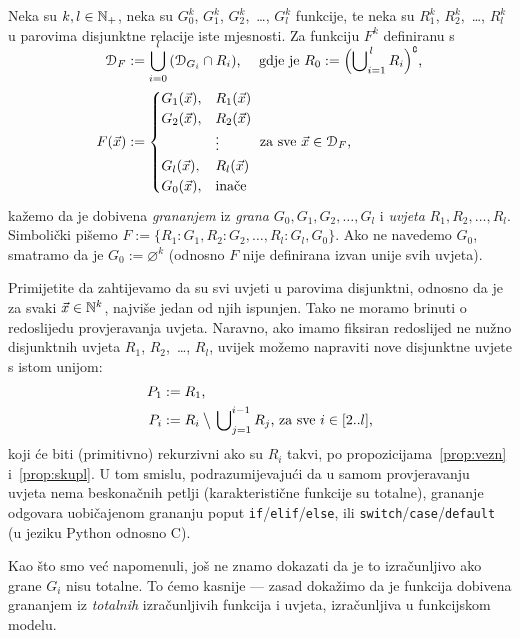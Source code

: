 \begin{definicija}[{name=[grananje]}]\label{def:gr}
Neka su $k,l\in{\mathbb N}_+$, neka su $G_0^k$, $G_1^k$, $G_2^k$,~\ldots, $G_l^k$ funkcije, te neka su $R_1^k$, $R_2^k$,~\ldots, $R_l^k$ u parovima disjunktne relacije iste mjesnosti. Za funkciju $F^k$ definiranu s
\begin{align}
\SwapAboveDisplaySkip
    \dom{F}&:=\bigcup_{i=0}^l\,(\dom{G_i}\cap R_i)\text{, \quad gdje je }
    R_0:=\Bigl(\bigcup\nolimits_{i=1}^{\,l}R_i\Bigr)\kompl\text,\\
    F(\vec x)&:=\begin{cases}
    G_1(\vec x),&R_1(\vec x)\\
    G_2(\vec x),&R_2(\vec x)\\
    &\vdots\\
    G_l(\vec x),&R_l(\vec x)\\
    G_0(\vec x),&\text{inače}
    \end{cases}\text{ za sve $\vec x\in\dom F$,}
\end{align}
kažemo da je dobivena \emph{grananjem} iz \emph{grana} $G_0,G_1,G_2,\dotsc,G_l$ i \emph{uvjeta} $R_1,R_2,\dotsc,R_l$. Simbolički pišemo $F:=\{R_1\colon G_1,R_2\colon G_2,\dotsc,R_l\colon G_l,G_0\}$. Ako ne navedemo $G_0$, smatramo da je $G_0:=\varnothing^k$ (odnosno $F$ nije definirana izvan unije svih uvjeta).
\end{definicija}

Primijetite da zahtijevamo da su svi uvjeti u parovima disjunktni, odnosno da je za svaki $\vec x\in{\mathbb N}^k$, najviše jedan od njih ispunjen. Tako ne moramo brinuti o redoslijedu provjeravanja uvjeta. Naravno, ako imamo fiksiran redoslijed ne nužno disjunktnih uvjeta $R_1$, $R_2$,~\ldots, $R_l$, uvijek možemo napraviti nove disjunktne uvjete s istom unijom:
\begin{align}
    P_1&:=R_1\text,\\
    P_i&:=R_i\mathbin{\big\backslash}\,\bigcup\nolimits_{j=1}^{i-1}R_j\text{, za sve $i\in[2..l]$,}
\end{align}
koji će biti (primitivno) rekurzivni ako su $R_i$ takvi, po propozicijama~\ref{prop:vezn} i~\ref{prop:skupl}. U tom smislu, podrazumijevajući da u samom provjeravanju uvjeta nema beskonačnih petlji (karakteristične funkcije su totalne), grananje odgovara uobičajenom grananju poput \texttt{if}/\texttt{elif}/\texttt{else}, ili \texttt{switch}/\texttt{case}/\texttt{default} (u jeziku Python odnosno C).

Kao što smo već napomenuli, još ne znamo dokazati da je to izračunljivo ako grane $G_i$ nisu totalne. To ćemo kasnije --- zasad dokažimo da je funkcija dobivena grananjem iz \emph{totalnih} izračunljivih funkcija i uvjeta, izračunljiva u funkcijskom modelu.

